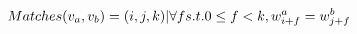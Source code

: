 \begin{comment}
\begin{algorithm}[H]
\KwIn{Two word lists, $w_1$, and $w_2$.}
\KwOut{Priority queue of longest possible matches.}
\SetKwRepeat{Repeat}{repeat}{until}
$l_1 \leftarrow$ length($w_1$) \;
$l_2 \leftarrow$ length($w_2$) \;
$idx \leftarrow $ IndexWordsByPositions($w_1$) \;
\For{$i_2 \leftarrow 0$ \KwTo length($w_2$)}{
    \If{$matched[i_1,i_2] \neq 1$}{
	$matches \leftarrow idx[ w_2[i_2] ]$ \;
	\For{$m \leftarrow 0$ \KwTo  length($matches$)}{
	    $i_1 \leftarrow matches[m]$ \;
	    $k \leftarrow 0$ \;
	    \Repeat{$i_1 + k < l_1 \wedge i_2 + k < l_2 \wedge
		w_1[i_1+k] = w_2[i_2+k]$}
	    {$k \leftarrow k+1$ \; }
	    \If{$k > 2$}{
		\For{$i \leftarrow 0$ \KwTo $k-1$}{
		    $matched[i_1+i,i_2+i] = 1$ \;
		}
		$q \leftarrow$ MatchQuality($k, i_1, l_1, i_2, l_2$) \;
		$prioQ.add( q, (i_1,i_2,k) )$ \;
	    }
	}
    }
}
\caption{Fill priority queue with large matches.}
\end{algorithm}

\begin{algorithm}[H]
\KwIn{A priority queue, $prioQ$, of longest possible matches.}
\KwOut{Edit script of block matches between $w_1$ and $w_2$.}
\While{$m \leftarrow prioQ.pop()$}{
    $(i_1, i_2, k) \leftarrow m$ \;
    \tcp{Scan for unmatched subregions}
    $start \leftarrow 0$ \;
    \While{$start < k \wedge (matched_1[i_1+start] = 1 \vee
	matched_2[i_2+start] = 1)$}{$start \leftarrow start+1$ \;}
    $end \leftarrow start + 1$ \;
    \While{$end < k \wedge matched_1[i_1+start] \neq 1 \wedge
	matched_2[i_2+start] \neq 1$}{$end \leftarrow end+1$ \;}
    \BlankLine
    \eIf{$end - start = k$}{
	\tcp{Found a match for our edit script}
	$editScript.add( \mathbf{MOV}(i_1, i_2, k) )$ \;
	\For{$i \leftarrow start$ \KwTo $end - 1$}{
	    $matched_1[i_1+i] = 1$ \;
	    $matched_2[i_2+i] = 1$ \;
	}
    }{
	\tcp{Found unmatched subregion, so calculate residual match}
	\While{$start < k$}{
	    $k' \leftarrow end - start$ \;
	    $q \leftarrow$ MatchQuality($k', i_1, l_1, i_2, l_2$) \;
	    $prioQ.add( q, (i_1,i_2,k') )$ \;
	    $i_1 \leftarrow i_1 + end$ \;
	    $i_2 \leftarrow i_2 + end$ \;
	    $k \leftarrow k - end$ \;
	    \tcp{Scan for unmatched subregions}
	    $start \leftarrow 0$ \;
	    \While{$start < k \wedge (matched_1[i_1+start] = 1 \vee
		    matched_2[i_2+start] = 1)$}{$start \leftarrow start+1$ \;}
	    $end \leftarrow start + 1$ \;
	    \While{$end < k \wedge matched_1[i_1+start] \neq 1 \wedge
		matched_2[i_2+start] \neq 1$}{$end \leftarrow end+1$ \;}
	}
    }
}
\caption{Greedy matching between two strings.}
\end{algorithm}


\begin{algorithm}[H]
\KwIn{Two word lists, $w_1$, and $w_2$.}
\KwOut{Edit script to transform $w_1$ into $w_2$.}
compute priority queue of longest matches \;
run through priority queue selecting best matches \;

\caption{Fast differencing algorithm}
\end{algorithm}

\end{comment}

\begin{equation}
Matches(v_{a}, v_{b}) = { (i,j,k) | \forall f s.t. 0 \le f < k, w^a_{i+f} = w^b_{j+f} }
\end{equation}
